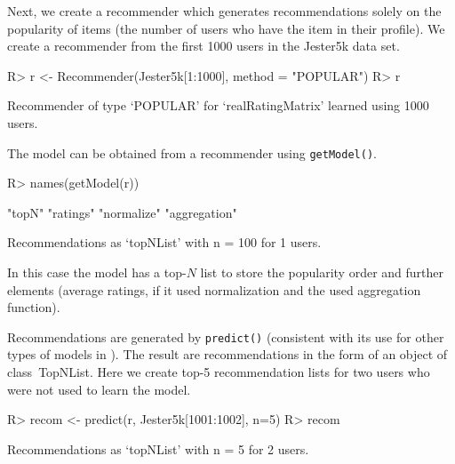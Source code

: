\documentclass[nojss]{jss}
\newcommand{\class}[1]{\mbox{\textsf{#1}}}
\newcommand{\func}[1]{\mbox{\texttt{#1()}}}
\begin{document}
Next, we create a recommender which generates recommendations
solely on the popularity of items (the number of users who have the item in
their profile). We create a recommender
from the first 1000 users in the Jester5k data set.

\begin{Schunk}
\begin{Sinput}
R> r <- Recommender(Jester5k[1:1000], method = "POPULAR")
R> r
\end{Sinput}
\begin{Soutput}
Recommender of type ‘POPULAR’ for ‘realRatingMatrix’
learned using 1000 users.
\end{Soutput}
\end{Schunk}

The model can be obtained from a recommender using \func{getModel}.
\begin{Schunk}
\begin{Sinput}
R> names(getModel(r))
\end{Sinput}
\begin{Soutput}
[1] "topN"        "ratings"     "normalize"   "aggregation"
\end{Soutput}
\begin{Soutput}
Recommendations as ‘topNList’ with n = 100 for 1 users.
\end{Soutput}
\end{Schunk}

In this case the model has a
top-$N$ list to store the popularity order and further
elements (average ratings, if it used normalization and the
used aggregation function).

Recommendations are generated by \func{predict}
(consistent with its use for other types of models in
). The result
are recommendations in the form of an object of class~\class{TopNList}.
Here we create top-5 recommendation lists for two
users who were not used to learn the model.

\begin{Schunk}
\begin{Sinput}
R> recom <- predict(r, Jester5k[1001:1002], n=5)
R> recom
\end{Sinput}
\begin{Soutput}
Recommendations as ‘topNList’ with n = 5 for 2 users.
\end{Soutput}
\end{Schunk}
\end{document}
